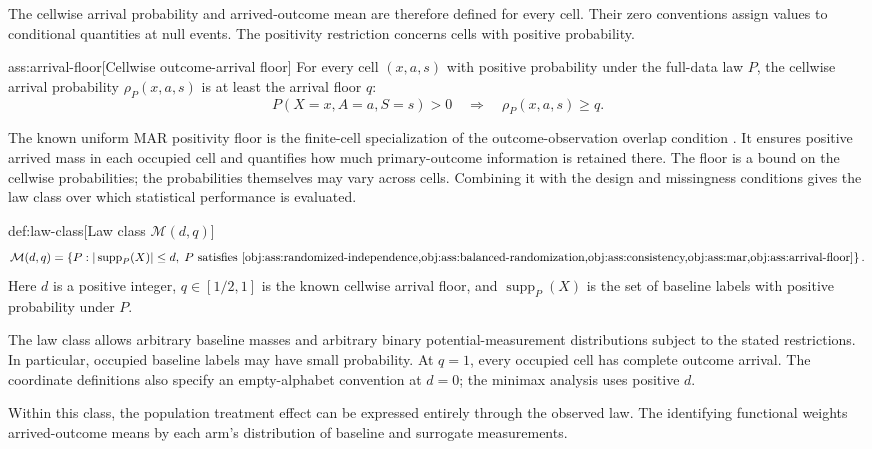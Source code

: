 The cellwise arrival probability  and arrived-outcome mean  are therefore defined for every cell. Their zero conventions assign values to conditional quantities at null events. The positivity restriction concerns cells with positive probability.

\begin{assumptionv}{ass:arrival-floor}[Cellwise outcome-arrival floor]
For every cell \((x,a,s)\) with positive probability under the full-data law \(P\), the cellwise arrival probability \(\rho_P(x,a,s)\) is at least the arrival floor \(q\):
\[
P(X=x,A=a,S=s)>0
\quad\Longrightarrow\quad
\rho_P(x,a,s)\ge q.
\]
\end{assumptionv}

The known uniform MAR positivity floor is the finite-cell specialization of the outcome-observation overlap condition \citep{KallusMao2025}. It ensures positive arrived mass in each occupied cell and quantifies how much primary-outcome information is retained there. The floor is a bound on the cellwise probabilities; the probabilities themselves may vary across cells. Combining it with the design and missingness conditions gives the law class over which statistical performance is evaluated.

\begin{definitionv}{def:law-class}[Law class \(\mathcal M(d,q)\)]
\[
\mathcal M(d,q)
=
\left\{
P:
|\operatorname{supp}_P(X)|\le d,\;
P\text{ satisfies }
\cref{obj:ass:randomized-independence,obj:ass:balanced-randomization,obj:ass:consistency,obj:ass:mar,obj:ass:arrival-floor}
\right\}.
\]
Here \(d\) is a positive integer, \(q\in[1/2,1]\) is the known cellwise arrival floor, and \(\operatorname{supp}_P(X)\) is the set of baseline labels with positive probability under \(P\).
\end{definitionv}

The law class  allows arbitrary baseline masses and arbitrary binary potential-measurement distributions subject to the stated restrictions. In particular, occupied baseline labels may have small probability. At \(q=1\), every occupied cell has complete outcome arrival. The coordinate definitions also specify an empty-alphabet convention at \(d=0\); the minimax analysis uses positive \(d\).

Within this class, the population treatment effect can be expressed entirely through the observed law. The identifying functional weights arrived-outcome means by each arm's distribution of baseline and surrogate measurements.

